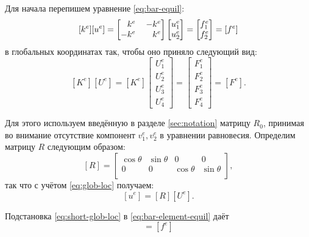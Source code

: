 \documentclass[10pt]{article}
\numberwithin{equation}{section}
\newcommand{\matr}[1]{[#1]}
\newcommand{\mm}{\llap{$-$}}
\newcommand{\phm}{\phantom{-}}
\begin{document}
Для начала перепишем уравнение \eqref{eq:bar-equil}:
\begin{equation}
  \label{eq:bar-element-equil}
  \matr{k^e}\matr{u^e}=
  \begin{bmatrix}
    \phm{}k^e&& \mm k^e\\
    -k^e && k^e    
  \end{bmatrix}
  \begin{bmatrix}
    u_1^e\\
    u_2^e
  \end{bmatrix}
  =
  \begin{bmatrix}
    f_1^e\\
    f_2^e
  \end{bmatrix}=\matr{f^e}
\end{equation}
в глобальных координатах так, чтобы оно приняло следующий вид:
\begin{equation}
  \label{eq:target-equil}
  \matr{K^e}\matr{U^e}=\matr{K^e}
  \begin{bmatrix}
    U_1^e\\
    U_2^e\\
    U_3^e\\
    U_4^e
  \end{bmatrix}
  =
  \begin{bmatrix}
    F_1^e\\
    F_2^e\\
    F_3^e\\
    F_4^e
  \end{bmatrix}=\matr{F^e}.
\end{equation}

Для этого используем введённую в разделе \ref{sec:notation} матрицу
$R_0$, принимая во внимание отсутствие компонент $v_1^e, v_2^e$ в
уравнении равновесия. Определим матрицу $R$ следующим образом:
\begin{equation}
  \label{eq:short-rotmatrix}
  \matr{R} =
  \begin{bmatrix}
    \cos\theta & \sin\theta & 0 & 0 \\
    0 & 0 & \cos\theta & \sin\theta \\
  \end{bmatrix},
\end{equation}
так что с учётом \eqref{eq:glob-loc} получаем:
\begin{equation}
  \label{eq:short-glob-loc}
  \matr{u^e} = \matr{R}\matr{U^e}.
\end{equation}

Подстановка \eqref{eq:short-glob-loc} в \eqref{eq:bar-element-equil} даёт
\begin{equation*}
  \matr{k^e}\matr{R}\matr{U^e}=\matr{f^e}
\end{equation*}
\end{document}
